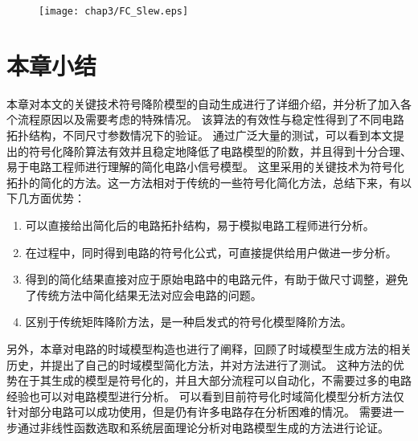 \begin{figure}[!htp]
	\centering
	\texttt{[image: chap3/FC\_Slew.eps]}
\end{figure}

\section{本章小结}
\label{sec:simp:con}

本章对本文的关键技术符号降阶模型的自动生成进行了详细介绍，并分析了加入各个流程原因以及需要考虑的特殊情况。
该算法的有效性与稳定性得到了不同电路拓扑结构，不同尺寸参数情况下的验证。
通过广泛大量的测试，可以看到本文提出的符号化降阶算法有效并且稳定地降低了电路模型的阶数，并且得到十分合理、易于电路工程师进行理解的简化电路小信号模型。
这里采用的关键技术为符号化拓扑的简化的方法。这一方法相对于传统的一些符号化简化方法，总结下来，有以下几方面优势：

\begin{enumerate}[label=\emph{\alph*})]
	\item 可以直接给出简化后的电路拓扑结构，易于模拟电路工程师进行分析。
	\item 在过程中，同时得到电路的符号化公式，可直接提供给用户做进一步分析。
	\item 得到的简化结果直接对应于原始电路中的电路元件，有助于做尺寸调整，避免了传统方法中简化结果无法对应会电路的问题。
	\item 区别于传统矩阵降阶方法，是一种启发式的符号化模型降阶方法。
\end{enumerate}

另外，本章对电路的时域模型构造也进行了阐释，回顾了时域模型生成方法的相关历史，并提出了自己的时域模型简化方法，并对方法进行了测试。
这种方法的优势在于其生成的模型是符号化的，并且大部分流程可以自动化，不需要过多的电路经验也可以对电路模型进行分析。
可以看到目前符号化时域简化模型分析方法仅针对部分电路可以成功使用，但是仍有许多电路存在分析困难的情况。
需要进一步通过非线性函数选取和系统层面理论分析对电路模型生成的方法进行论证。